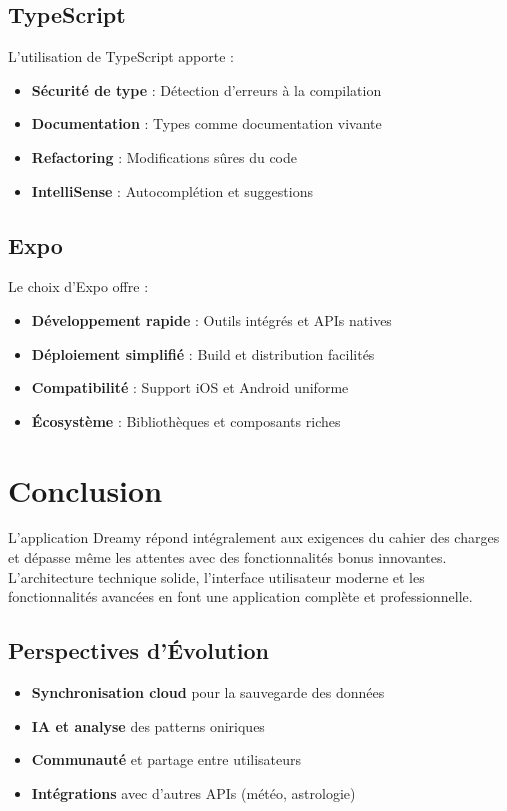 \documentclass[12pt,a4paper]{article}
\begin{document}
\subsection{TypeScript}

L'utilisation de TypeScript apporte :

\begin{itemize}
    \item \textbf{Sécurité de type} : Détection d'erreurs à la compilation
    \item \textbf{Documentation} : Types comme documentation vivante
    \item \textbf{Refactoring} : Modifications sûres du code
    \item \textbf{IntelliSense} : Autocomplétion et suggestions
\end{itemize}

\subsection{Expo}

Le choix d'Expo offre :

\begin{itemize}
    \item \textbf{Développement rapide} : Outils intégrés et APIs natives
    \item \textbf{Déploiement simplifié} : Build et distribution facilités
    \item \textbf{Compatibilité} : Support iOS et Android uniforme
    \item \textbf{Écosystème} : Bibliothèques et composants riches
\end{itemize}

\section{Conclusion}

L'application Dreamy répond intégralement aux exigences du cahier des charges et dépasse même les attentes avec des fonctionnalités bonus innovantes. L'architecture technique solide, l'interface utilisateur moderne et les fonctionnalités avancées en font une application complète et professionnelle.

\subsection{Perspectives d'Évolution}

\begin{itemize}
    \item \textbf{Synchronisation cloud} pour la sauvegarde des données
    \item \textbf{IA et analyse} des patterns oniriques
    \item \textbf{Communauté} et partage entre utilisateurs
    \item \textbf{Intégrations} avec d'autres APIs (météo, astrologie)
\end{itemize}
\end{document}
